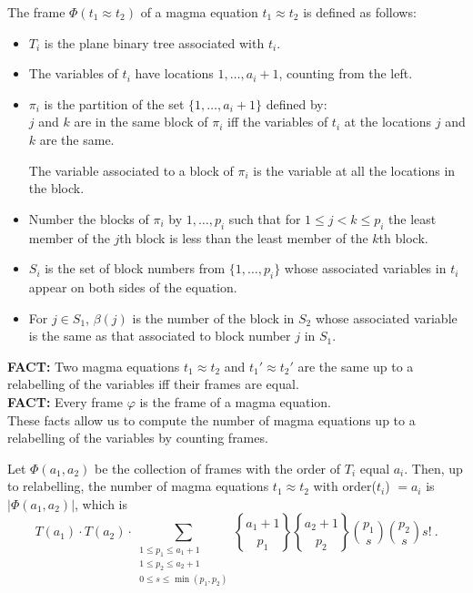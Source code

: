 \documentclass[12pt]{amsart}
\begin{document}
The frame $\Phi(t_1 \approx t_2)$ of a magma equation $t_1 \approx t_2$ is defined as follows:
\begin{itemize}
\item $T_i$ is the plane binary tree associated with $t_i$.
\item The variables of $t_i$ have locations $1,\ldots, a_i+1$, counting from the left.
\item $\pi_i$ is the partition of the set $\{1,\ldots,a_i + 1\}$ defined by: \\
$j$ and $k$ are in
the same block of $\pi_i$ iff the variables of $t_i$ at the locations $j$ and $k$ are the same.

The variable associated to a block of $\pi_i$ is the variable at all the locations in the block.
\item 
Number the blocks of $\pi_i$ by $1,\ldots,p_i$ such that for $1 \le j<k \le p_i$ the least member of the
$j$th block is less than the least member of the $k$th block.
\item
$S_i$ is the set of block numbers from $\{1,\ldots,p_i\}$ whose associated variables in $t_i$ appear 
on both sides of the equation.
\item
For $j \in S_1$, $\beta(j)$ is the number of the block in $S_2$ whose associated variable is the same as that associated to block number $j$ in $S_1$. 
\end{itemize}

{\bf FACT:} Two magma equations $t_1 \approx t_2$ and $t_1' \approx t_2'$ are the same up to a 
relabelling of the variables iff their frames are equal.\\

{\bf FACT:} Every frame $\varphi$ is the frame of a magma equation.\\

These facts allow us to compute the number of magma equations up to a relabelling of the variables 
by counting frames.

Let $\Phi(a_1,a_2)$ be the collection of frames with the order of $T_i$ equal $a_i$. 
Then, up to relabelling, the number of magma equations $t_1 \approx t_2$ 
with order($t_i$) $= a_i$ is $|\Phi(a_1,a_2)|$, 
which is
\begin{equation}\label{a1noteqa2}
T(a_1)\cdot T(a_2)\cdot \sum_{\substack{1 \le p_1 \le a_1+1\\ 1 \le p_2 \le a_2+1\\0\le s \le \min(p_1,p_2)}} 
{a_1+1 \brace p_1} {a_2+1 \brace p_2} {p_1 \choose s} {p_2\choose s} s! \ .
\end{equation}
\end{document}
